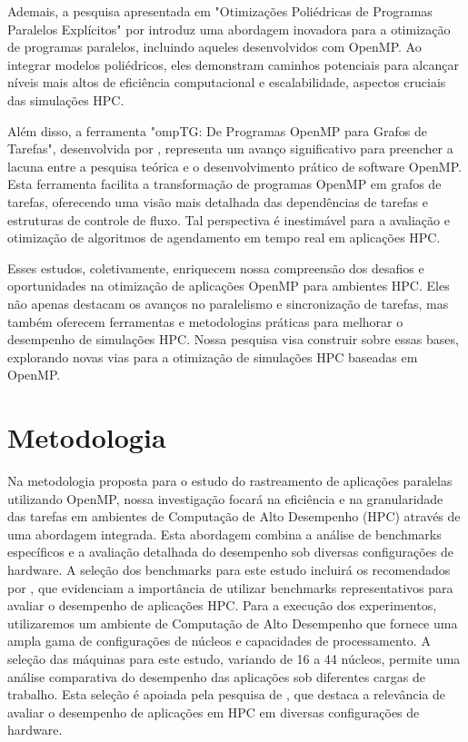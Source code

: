 \documentclass[ppgc,diss]{iiufrgs}
\begin{document}
Ademais, a pesquisa apresentada em "Otimizações Poliédricas de Programas Paralelos Explícitos" por  introduz uma abordagem inovadora para a otimização de programas paralelos, incluindo aqueles desenvolvidos com OpenMP. Ao integrar modelos poliédricos, eles demonstram caminhos potenciais para alcançar níveis mais altos de eficiência computacional e escalabilidade, aspectos cruciais das simulações HPC.

Além disso, a ferramenta "ompTG: De Programas OpenMP para Grafos de Tarefas", desenvolvida por , representa um avanço significativo para preencher a lacuna entre a pesquisa teórica e o desenvolvimento prático de software OpenMP. Esta ferramenta facilita a transformação de programas OpenMP em grafos de tarefas, oferecendo uma visão mais detalhada das dependências de tarefas e estruturas de controle de fluxo. Tal perspectiva é inestimável para a avaliação e otimização de algoritmos de agendamento em tempo real em aplicações HPC.

Esses estudos, coletivamente, enriquecem nossa compreensão dos desafios e oportunidades na otimização de aplicações OpenMP para ambientes HPC. Eles não apenas destacam os avanços no paralelismo e sincronização de tarefas, mas também oferecem ferramentas e metodologias práticas para melhorar o desempenho de simulações HPC. Nossa pesquisa visa construir sobre essas bases, explorando novas vias para a otimização de simulações HPC baseadas em OpenMP.



\section{Metodologia}

Na metodologia proposta para o estudo do rastreamento de aplicações paralelas utilizando OpenMP, nossa investigação focará na eficiência e na granularidade das tarefas em ambientes de Computação de Alto Desempenho (HPC) através de uma abordagem integrada. Esta abordagem combina a análise de benchmarks específicos e a avaliação detalhada do desempenho sob diversas configurações de hardware. A seleção dos benchmarks para este estudo incluirá os recomendados por \citet{Virouleau2014Evaluation}, que evidenciam a importância de utilizar benchmarks representativos para avaliar o desempenho de aplicações HPC.
Para a execução dos experimentos, utilizaremos um ambiente de Computação de Alto Desempenho que fornece uma ampla gama de configurações de núcleos e capacidades de processamento. A seleção das máquinas para este estudo, variando de 16 a 44 núcleos, permite uma análise comparativa do desempenho das aplicações sob diferentes cargas de trabalho. Esta seleção é apoiada pela pesquisa de \citet{Schmidl2013Assessing}, que destaca a relevância de avaliar o desempenho de aplicações em HPC em diversas configurações de hardware.
\end{document}
